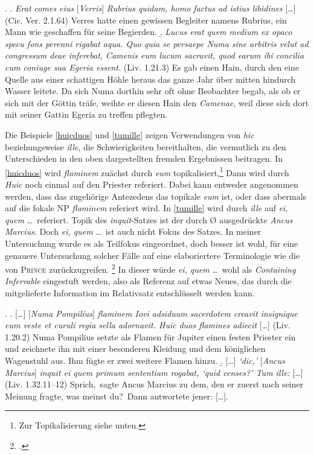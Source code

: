\documentclass[12pt]{article}
\newcommand{\lat}[1]{\textit{#1}} %
\begin{document}
\ex.
\a.
\label{cicfuttop}
\lat{Erat comes eius} [\lat{Verris}] \lat{ Rubrius quidam, homo factus ad istius libidines} [\ldots] (Cic. Ver. 2.1.64)
\trans Verres hatte einen gewissen Begleiter namens Rubrius, ein Mann wie geschaffen für seine Begierden.
\b.
\label{lucuserat}
\lat{Lucus erat quem medium ex opaco specu fons perenni rigabat aqua. Quo quia se persaepe Numa sine arbitris velut ad congressum deae inferebat, Camenis eum lucum sacravit, quod earum ibi concilia cum coniuge sua Egeria essent.} (Liv. 1.21.3)
\trans Es gab einen Hain, durch den eine Quelle aus einer schattigen Höhle heraus das ganze Jahr über mitten hindurch Wasser leitete.
Da sich Numa dorthin sehr oft ohne Beobachter begab, als ob er sich mit der Göttin träfe, weihte er diesen Hain den \lat{Camenae}, weil diese sich dort mit seiner Gattin Egeria zu treffen pflegten.

Die Beispiele \ref{huicduos} und \ref{tumille} zeigen Verwendungen von \lat{hic} beziehungsweise \lat{ille}, die Schwierigkeiten bereithalten, die vermutlich zu den Unterschieden in den oben dargestellten fremden Ergebnissen beitragen.
In \ref{huicduos} wird \lat{flaminem} zuächst durch \lat{eum} topikalisiert,\footnote{Zur Topikalisierung siehe unten.}
Dann wird durch \lat{Huic} noch einmal auf den Priester referiert.
Dabei kann entweder angenommen werden, dass das zugehörige Antezedens das topikale \lat{eum} ist, oder dass abermals auf die fokale NP \lat{flaminem} referiert wird.
In \ref{tumille} wird durch \lat{ille} auf \lat{ei, quem} \ldots\ referiert. Topik des \lat{inquit}-Satzes ist der durch Ø ausgedrückte \lat{Ancus Marcius}.
Doch \lat{ei, quem} \ldots\ ist auch nicht Fokus des Satzes. In meiner Untersuchung wurde es als Teilfokus eingeordnet, doch besser ist wohl, für eine genauere Untersuchung solcher Fälle auf eine elaboriertere Terminologie wie die von \textsc{Prince} zurückzugreifen.
\footcite[Siehe dazu][{}]{prince}
In dieser würde \lat{ei, quem} \ldots\ wohl als \emph{Containing Inferrable} eingestuft werden, also als Referenz auf etwas Neues, das durch die mitgelieferte Information im Relativsatz entschlüsselt werden kann.

\ex.
\a.
\label{huicduos}
[\ldots] [\lat{Numa Pompilius}] \lat{flaminem Iovi adsiduum sacerdotem creavit insignique eum veste et curuli regia sella adornavit. Huic duos flamines adiecit} [\ldots] (Liv. 1.20.2)
\trans Numa Pompilius setzte als Flamen für Jupiter einen festen Priester ein und zeichnete ihn mit einer besonderen Kleidung und dem königlichen Wagenstuhl aus. Ihm fügte er zwei weitere Flamen hinzu.
\b.
\label{tumille}
[\ldots] \lat{`dic,'} [\lat{Ancus Marcius}] \lat{inquit ei quem primum sententiam rogabat, `quid censes?' Tum ille: }[\ldots] (Liv. 1.32.11--12)
\trans \glqq Sprich,\grqq\ sagte Ancus Marcius zu dem, den er zuerst nach seiner Meinung fragte, \glqq was meinst du?\grqq\ Dann antwortete jener: [\ldots].
\end{document}
